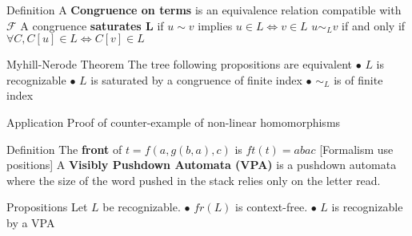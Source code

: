 \documentclass[pdf]{beamer}
\newcommand{\F}{\mathcal{F}}
\begin{document}
\begin{frame}

\begin{block}{Definition}
A \textbf{Congruence on terms} is an equivalence relation compatible with $\F$ \newline
A congruence \textbf{saturates L} if $u \sim v$ implies $u \in L \Leftrightarrow v \in L$ \newline
$u \sim_L v$ if and only if $\forall C, C[u] \in L \Leftrightarrow C[v] \in L$
\end{block}

\begin{alertblock}{Myhill-Nerode Theorem}
The tree following propositions are equivalent \newline
$\bullet$ $L$ is recognizable \newline
$\bullet$ $L$ is saturated by a congruence of finite index \newline
$\bullet$ $\sim_L$ is of finite index \newline	
\end{alertblock}

\begin{exampleblock}{Application}
Proof of counter-example of non-linear homomorphisms
\end{exampleblock}

\end{frame}

\begin{frame}

\begin{block}{Definition}
The \textbf{front} of $t=f(a,g(b,a),c)$ is $ft(t)=abac$ [Formalism use positions] \newline
A \textbf{Visibly Pushdown Automata (VPA)} is a pushdown automata where the size of the word pushed in the stack relies only on the letter read.
\end{block}

\begin{alertblock}{Propositions}
Let $L$ be recognizable.\newline
$\bullet$ $fr(L)$ is context-free. \newline
$\bullet$ $L$ is recognizable by a VPA \newline
\end{alertblock}

\end{frame}
\end{document}
